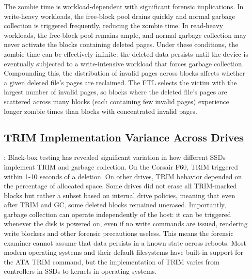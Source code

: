 The zombie time is workload-dependent with significant forensic implications. In write-heavy 
workloads, the free-block pool drains quickly and normal garbage collection is triggered frequently, reducing the 
zombie time. In read-heavy workloads, the free-block pool remains ample, and normal garbage collection may never 
activate the blocks containing deleted pages. Under these conditions, the zombie time can be 
effectively infinite: the deleted data persists until the device is eventually subjected to a write-intensive 
workload that forces garbage collection. Compounding this, the distribution of invalid 
pages across blocks affects whether a given deleted file's pages are reclaimed. The FTL selects the 
victim with the largest number of invalid pages, so blocks where the deleted file's pages are 
scattered across many blocks (each containing few invalid pages) experience longer zombie times 
than blocks with concentrated invalid pages.

\subsection*{TRIM Implementation Variance Across Drives}: 
Black-box testing has revealed significant variation in how different SSDs implement TRIM and 
garbage collection. On the Corsair F60, TRIM triggered within 1-10 seconds of a deletion. On other 
drives, TRIM behavior depended on the percentage of allocated space. Some drives did not erase all 
TRIM-marked blocks but rather a subset based on internal drive policies, meaning that even after 
TRIM and GC, some deleted blocks remained unerased. Importantly, garbage collection can operate 
independently of the host: it can be triggered whenever the disk is powered on, even if no write 
commands are issued, rendering write blockers and other forensic precautions useless. This means 
the forensic examiner cannot assume that data persists in a known state across reboots. Most modern 
operating systems and their default filesystems have built-in support for the ATA TRIM command, 
but the implementation of TRIM varies from controllers in SSDs to kernels in operating systems. \cite{Bonetti2014,trimwearlevelling2019}

